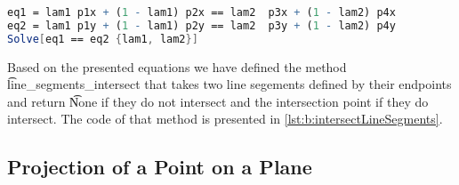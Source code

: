 	\begin{lstlisting}[float, language=Mathematica, label={lst:b:mat_lineSegmentIntersection}, caption={Mathematica code used to solve \autoref{eq:b:linesegmentintersectionequation}.}]
eq1 = lam1 p1x + (1 - lam1) p2x == lam2  p3x + (1 - lam2) p4x
eq2 = lam1 p1y + (1 - lam1) p2y == lam2  p3y + (1 - lam2) p4y
Solve[eq1 == eq2 {lam1, lam2}]\end{lstlisting}

Based on the presented equations we have defined the method \t{line_segments_intersect} that takes two line segements defined by their endpoints and return \t{None} if they do not intersect and the intersection point if they do intersect. The code of that method is presented in \autoref{lst:b:intersectLineSegments}.



\subsection*{Projection of a Point on a Plane}
